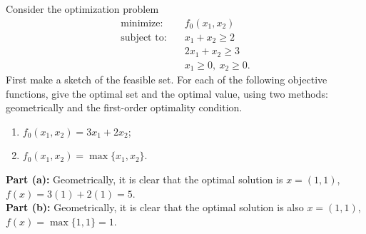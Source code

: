 \documentclass[11pt]{article}
\DeclareMathOperator{\minimize}{minimize:}
\DeclareMathOperator{\subjectto}{subject\ to:}
\begin{document}
\begin{homeworkProblem}
    Consider the optimization problem
    \begin{align*}
        \minimize  & \quad  f_0(x_1, x_2)             \\
        \subjectto & \quad  x_1 + x_2 \geq 2          \\
                   & \quad  2x_1 + x_2 \geq 3         \\
                   & \quad  x_1 \geq 0, \ x_2 \geq 0.
    \end{align*}
    First make a sketch of the feasible set. For each of the following objective functions, give
    the optimal set and the optimal value, using two methods: geometrically and the first-order
    optimality condition.
    \begin{enumerate}[label=(\alph*), topsep=5pt, itemsep=5pt]
        \item $f_0(x_1, x_2) = 3x_1 + 2x_2$;
        \item $f_0(x_1, x_2) = \max\{x_1, x_2\}$. \newline
    \end{enumerate}

    \solution

    \begin{figure}[hbpt!]
        \centering

    \end{figure}

    \textbf{Part (a):} Geometrically, it is clear that the optimal solution is $x = (1, 1)$, $f(x) = 3(1) + 2(1) = 5$. \\

    \textbf{Part (b):} Geometrically, it is clear that the optimal solution is also $x = (1, 1)$, $f(x) = \max\{1, 1\} = 1$.

\end{homeworkProblem}
\end{document}
